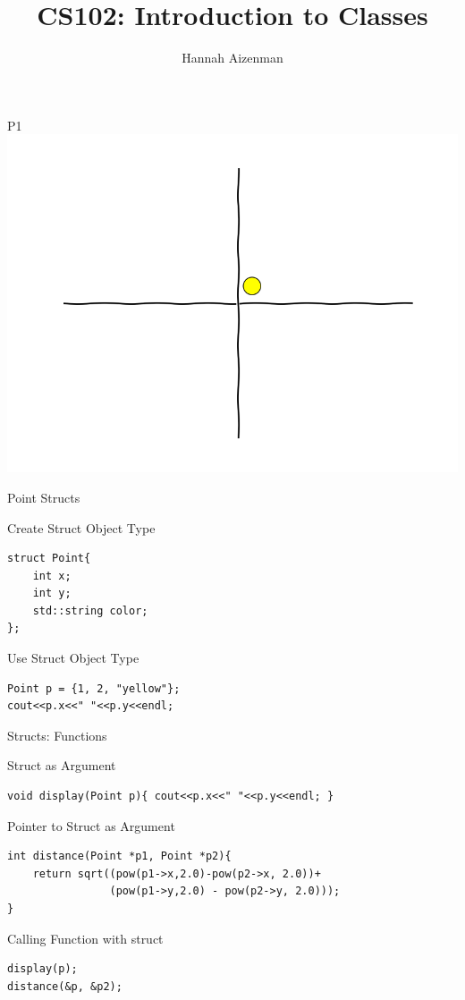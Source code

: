 \documentclass[xcolor={dvipsnames}]{beamer}
\begin{document}
\title{ CS102: Introduction to Classes}
\author{Hannah Aizenman}


\begin{frame}
	\titlepage
\end{frame}

\begin{frame}{P1}
	\includegraphics[width=1\textwidth]{traj000}
\end{frame}

\begin{frame}[fragile]{Point Structs}
\begin{block}{Create Struct Object Type}
\begin{verbatim}
struct Point{
    int x;
    int y;
    std::string color;
};
\end{verbatim}
\end{block}

\begin{block}{Use Struct Object Type}
\begin{verbatim}
Point p = {1, 2, "yellow"};
cout<<p.x<<" "<<p.y<<endl;
\end{verbatim}
\end{block}
\end{frame}

\begin{frame}[fragile]{Structs: Functions}
\begin{block}{Struct as Argument}
\begin{verbatim}
void display(Point p){ cout<<p.x<<" "<<p.y<<endl; }
\end{verbatim}
\end{block}
\begin{block}{Pointer to Struct as Argument}
\begin{verbatim}
int distance(Point *p1, Point *p2){
    return sqrt((pow(p1->x,2.0)-pow(p2->x, 2.0))+
                (pow(p1->y,2.0) - pow(p2->y, 2.0)));
}
\end{verbatim}
\begin{block}{Calling Function with struct}
\begin{verbatim}
display(p);
distance(&p, &p2);
\end{verbatim}
\end{block}
\end{block}
\end{frame}
\end{document}

